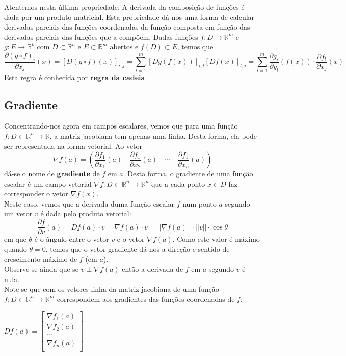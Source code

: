 \documentclass{article}
\begin{document}
Atentemos nesta última propriedade. A derivada da composição de funções é dada por um produto matricial. Esta propriedade dá-nos uma forma de calcular derivadas parciais das funções coordenadas da função composta em função das derivadas parciais das funções que a compôem. Dadas funções $f: D \to \mathbb{R}^m$ e $g: E \to \mathbb{R}^k$ com $D \subset \mathbb{R}^n$ e $E \subset \mathbb{R}^m$ abertos e $f(D) \subset E$, temos que
$$
\frac{\partial (g \circ f)_i }{\partial x_j}(x) = \left[ D(g \circ f)(x) \right]_{i,j} = \sum_{l=1}^m \left[ Dg(f(x)) \right]_{i,l} \left[ Df(x) \right]_{l,j} = \sum_{l=1}^m \frac{\partial g_i}{\partial y_l}(f(x)) \cdot \frac{\partial f_l}{\partial x_j}(x)
$$
Esta regra é conhecida por \textbf{regra da cadeia}.\\

\subsection{Gradiente}
Concentrando-nos agora em campos escalares, vemos que para uma função $f: D \subset \mathbb{R}^n \to \mathbb{R}$, a matriz jacobiana tem apenas uma linha. Desta forma, ela pode ser representada na forma vetorial. Ao vetor
$$
\nabla f(a) = \left( \frac{\partial f_1}{\partial x_1}(a) \quad \frac{\partial f_1}{\partial x_2}(a) \quad \cdots \quad \frac{\partial f_1}{\partial x_n}(a) \right)
$$
dá-se o nome de \textbf{gradiente} de $f$ em $a$. Desta forma, o gradiente de uma função escalar é um campo vetorial $\nabla f: D \subset \mathbb{R}^n \to \mathbb{R}^n$ que a cada ponto $x \in D$ faz corresponder o vetor $\nabla f(x)$.\\
Neste caso, vemos que a derivada duma função escalar $f$ num ponto $a$ segundo um vetor $v$ é dada pelo produto vetorial:
$$
\frac{\partial f}{\partial v}(a) = Df(a) \cdot v = \nabla f(a) \cdot v = || \nabla f(a) || \cdot ||v|| \cdot \cos \theta
$$
em que $\theta$ é o ângulo entre o vetor $v$ e o vetor $\nabla f(a)$. Como este valor é máximo quando $\theta = 0$, temos que o vetor gradiente dá-nos a direção e sentido de crescimento máximo de $f$ (em $a$).\\
Observe-se ainda que se $v \perp \nabla f(a)$ então a derivada de $f$ em $a$ segundo $v$ é nula.\\
Note-se que com os vetores linha da matriz jacobiana de uma função $f: D \subset \mathbb{R}^n \to \mathbb{R}^m$ correspondem aos gradientes das funções coordenadas de $f$:
\begin{center}$
\renewcommand*{\arraystretch}{1.2}
Df(a) =
\begin{bmatrix}
\nabla f_1(a) \\
\nabla f_2(a) \\
\cdots \\
\nabla f_n(a) \\
\end{bmatrix}$
\end{center}
\end{document}
